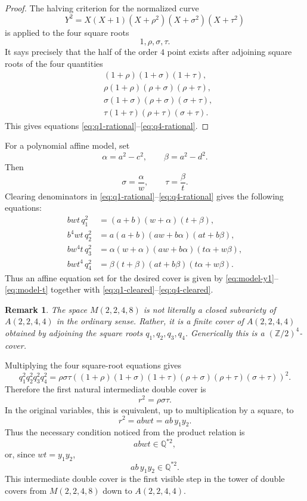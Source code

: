 \documentclass[11pt]{article}
\newtheorem{remark}{Remark}
\begin{document}
\begin{proof}
The halving criterion for the normalized curve
\[
    Y^2=X(X+1)(X+\rho^2)(X+\sigma^2)(X+\tau^2)
\]
is applied to the four square roots
\[
    1,\rho,\sigma,\tau.
\]
It says precisely that the half of the order $4$ point exists after adjoining
square roots of the four quantities
\begin{align*}
    &(1+\rho)(1+\sigma)(1+\tau),\\
    &\rho(1+\rho)(\rho+\sigma)(\rho+\tau),\\
    &\sigma(1+\sigma)(\rho+\sigma)(\sigma+\tau),\\
    &\tau(1+\tau)(\rho+\tau)(\sigma+\tau).
\end{align*}
This gives equations \eqref{eq:q1-rational}--\eqref{eq:q4-rational}.
\end{proof}

For a polynomial affine model, set
\[
    \alpha=a^2-c^2,
    \qquad
    \beta=a^2-d^2.
\]
Then
\[
    \sigma=\frac{\alpha}{w},
    \qquad
    \tau=\frac{\beta}{t}.
\]
Clearing denominators in \eqref{eq:q1-rational}--\eqref{eq:q4-rational}
gives the following equations:
\begin{align}
    bwt\,q_1^2
    &=(a+b)(w+\alpha)(t+\beta), \label{eq:q1-cleared}\\
    b^4wt\,q_2^2
    &=a(a+b)(aw+b\alpha)(at+b\beta), \label{eq:q2-cleared}\\
    bw^4t\,q_3^2
    &=\alpha(w+\alpha)(aw+b\alpha)(t\alpha+w\beta), \label{eq:q3-cleared}\\
    bwt^4\,q_4^2
    &=\beta(t+\beta)(at+b\beta)(t\alpha+w\beta). \label{eq:q4-cleared}
\end{align}
Thus an affine equation set for the desired cover is given by
\eqref{eq:model-y1}--\eqref{eq:model-t} together with
\eqref{eq:q1-cleared}--\eqref{eq:q4-cleared}.

\begin{remark}
The space $M(2,2,4,8)$ is not literally a closed subvariety of
$A(2,2,4,4)$ in the ordinary sense. Rather, it is a finite cover of
$A(2,2,4,4)$ obtained by adjoining the square roots $q_1,q_2,q_3,q_4$.
Generically this is a $(\mathbb Z/2)^4$-cover.
\end{remark}

Multiplying the four square-root equations gives
\[
q_1^2q_2^2q_3^2q_4^2
=
\rho\sigma\tau
\left(
(1+\rho)(1+\sigma)(1+\tau)
(\rho+\sigma)(\rho+\tau)(\sigma+\tau)
\right)^2.
\]
Therefore the first natural intermediate double cover is
\[
    r^2=\rho\sigma\tau.
\]
In the original variables, this is equivalent, up to multiplication by a
square, to
\[
    r^2=abwt=ab\,y_1y_2.
\]
Thus the necessary condition noticed from the product relation is
\[
    abwt\in \mathbb Q^{*2},
\]
or, since $wt=y_1y_2$,
\[
    ab\,y_1y_2\in \mathbb Q^{*2}.
\]
This intermediate double cover is the first visible step in the tower of
double covers from $M(2,2,4,8)$ down to $A(2,2,4,4)$.
\end{document}
